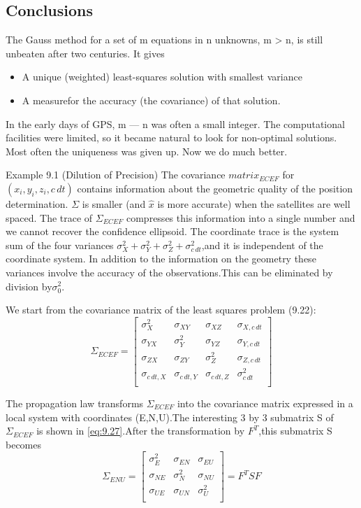 	\subsection{Conclusions}
		The Gauss method for a set of m equations in n unknowns, m > n, is still unbeaten after two centuries. It gives
		\begin{itemize}
			\item A unique (weighted) least-squares solution with smallest variance
			\item A measurefor the accuracy (the covariance) of that solution.
		\end{itemize}
			
		In the early days of GPS, m — n was often a small integer. The computational facilities were limited, so it became natural to look for non-optimal solutions. Most often the uniqueness was given up. Now we do much better.
		
		Example 9.1 (Dilution of Precision) The covariance $matrix_{ECEF}$ for $(x_i,y_i,z_i,c\,dt)$ contains information about the geometric quality of the position determination. $\Sigma$ is smaller (and $\hat{x}$ is more accurate) when the satellites are well spaced. The trace of $\Sigma_{ECEF}$ compresses this information into a single number and we cannot recover the confidence ellipsoid. The coordinate trace is the system sum of the four variances $\sigma^2_X+\sigma^2_Y+\sigma^2_Z+\sigma^2_{c\,dt}$,and it is independent of the coordinate system. In addition to the information on the geometry these variances involve the accuracy of the observations.This can be eliminated by division by$\sigma^2_0$.
			
		We start from the covariance matrix of the least squares problem (9.22):
		\begin{equation}\label{eq:9.27}
			\Sigma_{ECEF} = 
			\begin{bmatrix}
				\sigma^2_X & \sigma_{XY} & \sigma_{XZ} & \sigma_{X,c\,dt} \\
				\sigma_{YX}& \sigma^2_Y  & \sigma_{YZ} & \sigma_{Y,c\,dt} \\
				\sigma_{ZX}& \sigma_{ZY} & \sigma^2_Z & \sigma_{Z,c\,dt} \\
				\sigma_{c\,dt,X} & \sigma_{c\,dt,Y} & \sigma_{c\,dt,Z} & \sigma^2_{c\,dt} \\
			\end{bmatrix}
		\end{equation}
		
		The propagation law transforms $\Sigma_{ECEF}$ into the covariance matrix expressed in a local system with coordinates (E,N,U).The interesting 3 by 3 submatrix S of $\Sigma_{ECEF}$ is shown in \ref{eq:9.27}.After the transformation by $F^T$,this submatrix S becomes
		\begin{equation}\label{eq:9.28}
			\Sigma_{ENU} = 
			\begin{bmatrix}
				\sigma^2_E & \sigma_{EN} & \sigma_{EU} \\
				\sigma_{NE}& \sigma^2_N  & \sigma_{NU} \\
				\sigma_{UE}& \sigma_{UN} & \sigma^2_U \\
			\end{bmatrix}
			=F^TSF
		\end{equation} 
			

